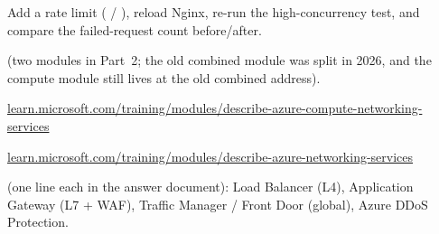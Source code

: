 \documentclass[11pt]{article}
\begin{document}

Add a rate limit ( / ), reload Nginx, re-run the high-concurrency
test, and compare the failed-request count before/after.

(two modules in Part~2; the old combined module was split in 2026, and the compute module still lives
at the old combined address).
\par\noindent\mbox{\href{https://learn.microsoft.com/training/modules/describe-azure-compute-networking-services/}{learn.microsoft.com/training/modules/describe-azure-compute-networking-services}}
\par\noindent\mbox{\href{https://learn.microsoft.com/training/modules/describe-azure-networking-services/}{learn.microsoft.com/training/modules/describe-azure-networking-services}}

 (one line each in the answer document): Load Balancer (L4),
Application Gateway (L7 + WAF), Traffic Manager / Front Door (global), Azure DDoS Protection.


\end{document}
